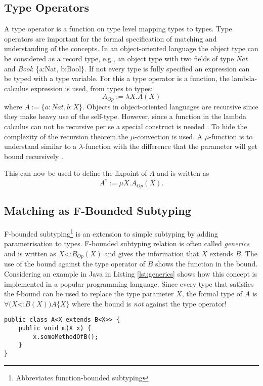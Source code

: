 \subsection{Type Operators}
A type operator is a function on type level mapping types to types. Type
operators are important for the formal specification of matching and
understanding of the concepts. In an object-oriented language the object
type can be considered as a record type, e.g., an object type with two
fields of type \emph{Nat} and \emph{Bool}: \{a:Nat, b:Bool\}. If not
every type is fully specified an expression can be typed with a type
variable. For this a type operator is a function, the lambda-calculus
expression is used, from types to types: \[A_{Op} := \lambda X.A(X)
\] where $A := \{a:Nat, b:X\}$. Objects in object-oriented languages
are recursive since they make heavy use of the self-type. However,
since a function in the lambda calculus can not be recursive per se
a special construct is needed \cite{gabriel_why_1988}. To hide the
complexity of the recursion theorem the $\mu$-convection is used. A
$\mu$-function is to understand similar to a $\lambda$-function
with the difference that the parameter will get bound recursively
\cite{pierce_types_2002,simons_theory_2002-3}.

This can now be used to define the fixpoint of $A$ and is written as \[A^*
:= \mu X.A_{Op}(X).\]


\subsection{Matching as F-Bounded Subtyping}
F-bounded subtyping\footnote{Abbreviates function-bounded subtyping}
is an extension to simple subtyping by adding parametrisation to
types. F-bounded subtyping relation is often called \emph{generics}
and is written as $X$<:$B_{Op}(X)$ and gives the information that $X$
extends $B$. The use of the bound against the type operator of $B$
shows the function in the bound. Considering an example in Java in
Listing \ref{lst:generics} shows how this concept is implemented in a popular
programming language. Since every type that satisfies the f-bound can
be used to replace the type parameter $X$, the formal type of $A$ is
$\forall(X$<:$B(X))A\{X\}$ where the bound is \emph{not} against the
type operator!

\begin{lstlisting}[float,caption={Universal quantified f-bound in Java},label={lst:generics}]
public class A<X extends B<X>> {
	public void m(X x) {
		x.someMethodOfB();
	}
}
\end{lstlisting}

